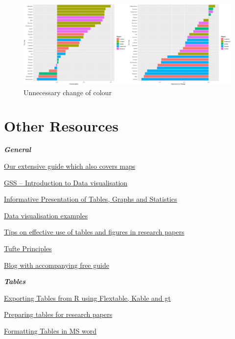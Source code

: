 \documentclass[
]{book}
\begin{document}
\begin{figure}
\centering
\includegraphics{img/b2b plots.png}
\caption{Unnecessary change of colour}
\end{figure}

\hypertarget{other-resources}{%
\section{Other Resources}\label{other-resources}}

\textbf{\emph{General}}

\href{}{Our extensive guide which also covers maps}

\href{https://gss.civilservice.gov.uk/policy-store/introduction-to-data-visualisation/\#section-7}{GSS -- Introduction to Data visualisation}

\href{https://stats4sd.org/resources/412}{Informative Presentation of Tables, Graphs and Statistics}

\href{https://stats4sd.org/resources/59}{Data visualisation examples}

\href{https://www.editage.com/insights/tips-on-effective-use-of-tables-and-figures-in-research-papers}{Tips on effective use of tables and figures in research papers}

\href{https://sites.google.com/site/tufteondesign/home/six-fundamental-principles-of-design}{Tufte Principles}

\href{https://blog.hubspot.com/marketing/great-data-visualization-examples}{Blog with accompanying free guide}

\textbf{\emph{Tables}}

\href{https://stats4sd.org/resources/506}{Exporting Tables from R using Flextable, Kable and gt}

\href{https://www.manuscriptedit.com/scholar-hangout/preparing-tables-research-papers/}{Preparing tables for research papers}

\href{http://www.docs.is.ed.ac.uk/skills/documents/3575/3575.pdf}{Formatting Tables in MS word}
\end{document}
